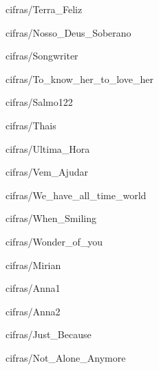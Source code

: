 \documentclass{scrartcl}
\begin{document}

{cifras/Terra_Feliz}


{cifras/Nosso_Deus_Soberano}


{cifras/Songwriter}


{cifras/To_know_her_to_love_her}


{cifras/Salmo122}


{cifras/Thais}


{cifras/Ultima_Hora}


{cifras/Vem_Ajudar}


{cifras/We_have_all_time_world}


{cifras/When_Smiling}


{cifras/Wonder_of_you}


{cifras/Mirian}


{cifras/Anna1}


{cifras/Anna2}


{cifras/Just_Because}


{cifras/Not_Alone_Anymore}
\end{document}
